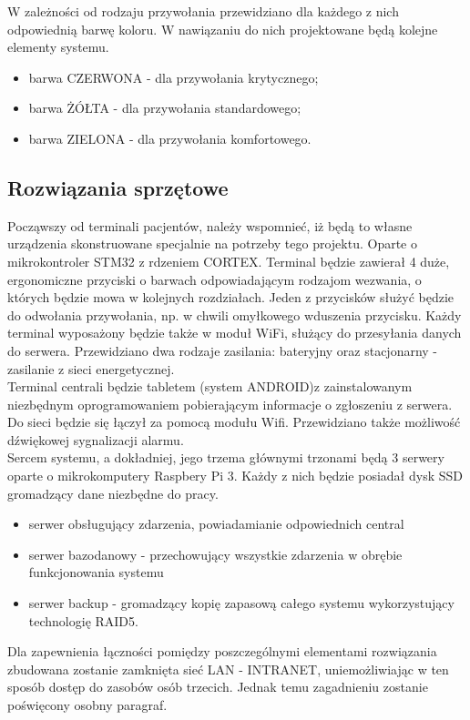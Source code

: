 \documentclass[12pt]{article} %
\begin{document}
W zależności od rodzaju przywołania przewidziano dla każdego z nich odpowiednią barwę koloru. W nawiązaniu do nich projektowane będą kolejne elementy systemu.

\begin{itemize}
\item barwa CZERWONA - dla przywołania krytycznego;
\item barwa ŻÓŁTA - dla przywołania standardowego;
\item barwa ZIELONA - dla przywołania komfortowego.
\end{itemize}
\subsection{Rozwiązania sprzętowe}

Począwszy od terminali pacjentów, należy wspomnieć, iż będą to własne urządzenia skonstruowane specjalnie na potrzeby tego projektu. Oparte o mikrokontroler STM32 z rdzeniem CORTEX. Terminal będzie zawierał 4 duże, ergonomiczne przyciski o barwach odpowiadającym rodzajom wezwania, o których będzie mowa w kolejnych rozdziałach. Jeden z przycisków służyć będzie do odwołania przywołania, np. w chwili omyłkowego wduszenia przycisku. Każdy terminal wyposażony będzie także w moduł WiFi, służący do przesyłania danych do serwera. Przewidziano dwa rodzaje zasilania: bateryjny oraz stacjonarny - zasilanie z sieci energetycznej. 
\\
Terminal centrali będzie tabletem (system ANDROID)z zainstalowanym niezbędnym oprogramowaniem pobierającym informacje o zgłoszeniu z serwera. Do sieci będzie się łączył za pomocą modułu Wifi. Przewidziano także możliwość dźwiękowej sygnalizacji alarmu.
\\
Sercem systemu, a dokładniej, jego trzema głównymi trzonami będą 3 serwery oparte o mikrokomputery Raspbery Pi 3. Każdy z nich będzie posiadał dysk SSD gromadzący dane niezbędne do pracy.
\begin{itemize}
\item serwer obsługujący zdarzenia, powiadamianie odpowiednich central
\item serwer bazodanowy - przechowujący wszystkie zdarzenia w obrębie funkcjonowania systemu
\item serwer backup - gromadzący kopię zapasową całego systemu wykorzystujący technologię RAID5.
\end{itemize}

Dla zapewnienia łączności pomiędzy poszczególnymi elementami rozwiązania zbudowana zostanie zamknięta sieć LAN - INTRANET, uniemożliwiając w ten sposób dostęp do zasobów osób trzecich. Jednak temu zagadnieniu zostanie poświęcony osobny paragraf.
\end{document}

